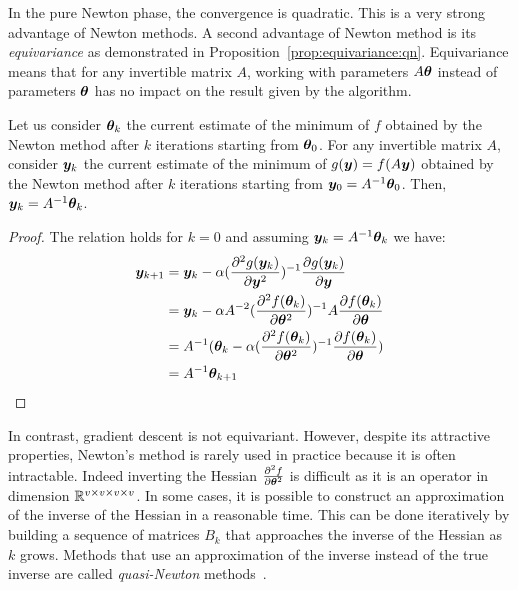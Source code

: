 In the pure Newton phase, the convergence is quadratic. This is a very strong
advantage of Newton methods.
A second advantage of Newton method is its \emph{equivariance} as demonstrated
in Proposition~\ref{prop:equivariance:qn}. Equivariance means that for any
invertible matrix $A$, working with
parameters $A \thetab$ instead of parameters $\thetab$ has no impact on the result given
by the algorithm.
\begin{proposition}
  \label{prop:equivariance:qn}
  Let us consider $\thetab_k$ the current estimate of the minimum of $f$ obtained by
  the Newton method after $k$ iterations starting from $\thetab_0$.
  For any invertible matrix $A$, consider $\yb_k$ the current estimate of the
  minimum of $g(\yb) = f(A\yb)$
  obtained by the Newton method after $k$ iterations starting from $\yb_0 = A^{-1}\thetab_0$.
  Then, $\yb_k = A^{-1} \thetab_k$.
\end{proposition}
\begin{proof}
  The relation holds for $k=0$ and assuming $\yb_k = A^{-1} \thetab_k$ we have:
\begin{align}
  \yb_{k+1} &= \yb_k -\alpha (\partialfrac{\yb^2}{^2 g(\yb_k)})^{-1} \partialfrac{\yb}{g(\yb_k)} \\
  &= \yb_k -\alpha A^{-2}(\partialfrac{\thetab^2}{^2 f(\thetab_k)})^{-1} A \partialfrac{\thetab}{f(\thetab_k)} \\
  &= A^{-1} (\thetab_k -\alpha (\partialfrac{\thetab^2}{^2 f(\thetab_k)})^{-1} \partialfrac{\thetab}{f( \thetab_k)}) \\
            &= A^{-1} \thetab_{k+1} \\
\end{align}
\end{proof}
In contrast, gradient descent is not equivariant.
However, despite its attractive properties, Newton's method is rarely used in
practice because it is often intractable. Indeed inverting
the Hessian $\partialfrac{\thetab^2}{^2 f}$ is difficult as it is an operator in
dimension $\RR^{v \times v \times v \times
  v}$.
In some cases, it is possible to construct an approximation of the inverse of
the Hessian in a reasonable time. This can be done iteratively by building a
sequence of matrices $B_k$ that approaches the inverse of the Hessian as $k$ grows.
Methods that use an approximation of the inverse instead of the true inverse are
called \emph{quasi-Newton} methods~\cite{gill1972quasi}. 

